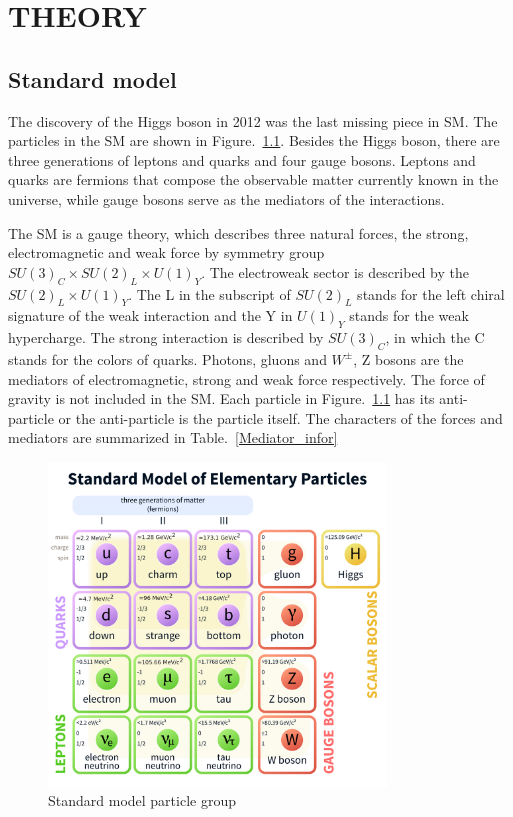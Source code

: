 
\chapter{THEORY}

\section{Standard model}
The discovery of the Higgs boson in 2012 was the last missing piece in SM.  The particles in the SM are shown in Figure.~\ref{fig:SM_particles}. Besides the Higgs boson, there are three generations of leptons and quarks and four gauge bosons. 
Leptons and quarks are fermions that compose the observable matter currently known in the universe, while gauge bosons serve as the mediators of the interactions.  

The SM is a gauge theory, which describes three natural forces, the strong, electromagnetic and weak force by symmetry group $SU(3)_{C}\times SU(2)_{L}\times U(1)_{Y}$. The electroweak sector is described by the  $SU(2)_{L}\times U(1)_{Y}$. The L in the subscript of $SU(2)_{L}$ stands for the left chiral signature of the weak interaction and the Y in $U(1)_{Y}$ stands for the weak hypercharge. The strong interaction is described by $SU(3)_{C}$, in which the C stands for the colors of quarks.  Photons, gluons and $W^{\pm}$, Z bosons are the mediators of electromagnetic, strong and weak force respectively. The force of gravity is not included in the SM. Each particle in Figure.~\ref{fig:SM_particles} has its anti-particle or the anti-particle is the particle itself. The characters of the forces and mediators are summarized in Table.~\ref{Mediator_infor}

\begin{figure}[htbp] 
\centering
\includegraphics[width=0.8\textwidth]{chapter2/SM_particle_table.pdf}
\caption[Standard model particle group]{Standard model particle group\cite{SM_particletable}}
\label{fig:SM_particles}
\end{figure}


